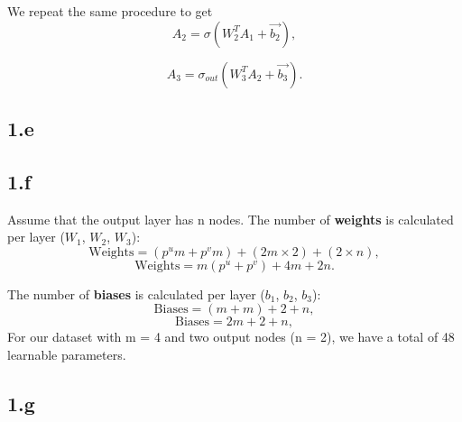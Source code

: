 \documentclass[12pt,halfline,a4paper,]{ouparticle}
\newenvironment{Shaded}{\begin{snugshade}}{\end{snugshade}}
\newcommand{\CommentTok}[1]{\textcolor[rgb]{0.56,0.35,0.01}{\textit{#1}}}
\newcommand{\DecValTok}[1]{\textcolor[rgb]{0.00,0.00,0.81}{#1}}
\newcommand{\FunctionTok}[1]{\textcolor[rgb]{0.13,0.29,0.53}{\textbf{#1}}}
\newcommand{\NormalTok}[1]{#1}
\newcommand{\OtherTok}[1]{\textcolor[rgb]{0.56,0.35,0.01}{#1}}
\newcommand{\SpecialCharTok}[1]{\textcolor[rgb]{0.81,0.36,0.00}{\textbf{#1}}}
\begin{document}
We repeat the same procedure to get \[
A_2 = \sigma(W_2^T A_1 + \vec{b_2}),
\]

\[
A_3 = \sigma_{out}(W_3^T A_2 + \vec{b_3}).
\]

\subsection*{1.e}\label{e}

\begin{Shaded}
\end{Shaded}

\subsection*{1.f}\label{f}

Assume that the output layer has n nodes. The number of \textbf{weights}
is calculated per layer (\(W_1\), \(W_2\), \(W_3\)): \[
\text{Weights} = (p^u m + p^v m) + (2m \times 2) + (2 \times n),
\] \[\text{Weights} = m(p^u + p^v) + 4m + 2n.\]

The number of \textbf{biases} is calculated per layer (\(b_1\), \(b_2\),
\(b_3\)): \[
\text{Biases} = (m + m) + 2 + n,
\] \[
\text{Biases} = 2m + 2 + n,
\] For our dataset with m = 4 and two output nodes (n = 2), we have a
total of 48 learnable parameters.

\subsection*{1.g}\label{g}
\end{document}
